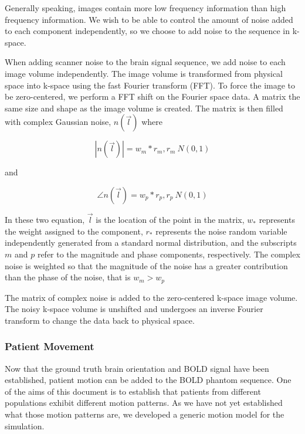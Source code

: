 Generally speaking, images contain more low frequency information than high frequency information. We wish to be able to control the amount of noise added to each component independently, so we choose to add noise to the sequence in k-space.

When adding scanner noise to the brain signal sequence, we add noise to each image volume independently. The image volume is transformed from physical space into k-space using the fast Fourier transform (FFT). To force the image to be zero-centered, we perform a FFT shift on the Fourier space data. A matrix the same size and shape as the image volume is created. The matrix is then filled with complex Gaussian noise, $n(\vec{l})$ where

\begin{equation}
|n(\vec{l})| = w_m * r_m, r_m~N(0,1)
\end{equation}

\noindent and

\begin{equation}
\angle n(\vec{l}) = w_p * r_p, r_p~N(0,1)
\end{equation}

\noindent In these two equation, $\vec{l}$ is the location of the point in the matrix, $w_*$ represents the weight assigned to the component, $r_*$ represents the noise random variable independently generated from a standard normal distribution, and the subscripts $m$ and $p$ refer to the magnitude and phase components, respectively. The complex noise is weighted so that the magnitude of the noise has a greater contribution than the phase of the noise, that is $w_m > w_p$ 

The matrix of complex noise is added to the zero-centered k-space image volume. The noisy k-space volume is unshifted and undergoes an inverse Fourier transform to change the data back to physical space.

\subsubsection{Patient Movement}

Now that the ground truth brain orientation and BOLD signal have been established, patient motion can be added to the BOLD phantom sequence. One of the aims of this document is to establish that patients from different populations exhibit different motion patterns. As we have not yet established what those motion patterns are, we developed a generic motion model for the simulation.

